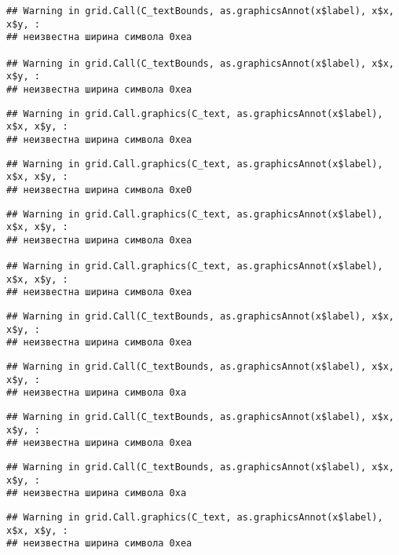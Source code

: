 \documentclass[
]{article}
\begin{document}
\begin{verbatim}
## Warning in grid.Call(C_textBounds, as.graphicsAnnot(x$label), x$x, x$y, :
## неизвестна ширина символа 0xea

## Warning in grid.Call(C_textBounds, as.graphicsAnnot(x$label), x$x, x$y, :
## неизвестна ширина символа 0xea
\end{verbatim}

\begin{verbatim}
## Warning in grid.Call.graphics(C_text, as.graphicsAnnot(x$label), x$x, x$y, :
## неизвестна ширина символа 0xea
\end{verbatim}

\begin{verbatim}
## Warning in grid.Call.graphics(C_text, as.graphicsAnnot(x$label), x$x, x$y, :
## неизвестна ширина символа 0xe0
\end{verbatim}

\begin{verbatim}
## Warning in grid.Call.graphics(C_text, as.graphicsAnnot(x$label), x$x, x$y, :
## неизвестна ширина символа 0xea

## Warning in grid.Call.graphics(C_text, as.graphicsAnnot(x$label), x$x, x$y, :
## неизвестна ширина символа 0xea
\end{verbatim}

\begin{verbatim}
## Warning in grid.Call(C_textBounds, as.graphicsAnnot(x$label), x$x, x$y, :
## неизвестна ширина символа 0xea
\end{verbatim}

\begin{verbatim}
## Warning in grid.Call(C_textBounds, as.graphicsAnnot(x$label), x$x, x$y, :
## неизвестна ширина символа 0xa
\end{verbatim}

\begin{verbatim}
## Warning in grid.Call(C_textBounds, as.graphicsAnnot(x$label), x$x, x$y, :
## неизвестна ширина символа 0xea
\end{verbatim}

\begin{verbatim}
## Warning in grid.Call(C_textBounds, as.graphicsAnnot(x$label), x$x, x$y, :
## неизвестна ширина символа 0xa
\end{verbatim}

\begin{verbatim}
## Warning in grid.Call.graphics(C_text, as.graphicsAnnot(x$label), x$x, x$y, :
## неизвестна ширина символа 0xea
\end{verbatim}
\end{document}

